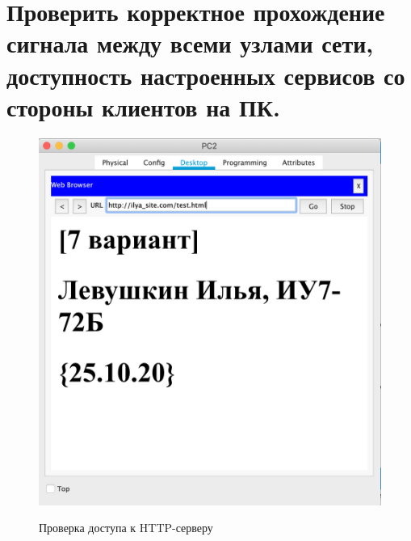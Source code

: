 \documentclass[a4paper,12pt]{article}
\begin{document}
	\newpage
	
	
	\section{Проверить корректное прохождение сигнала между всеми узлами сети, доступность настроенных сервисов со стороны клиентов на ПК.}
	
	\begin{figure}[h!]
		\begin{center}
			{\includegraphics[scale = 0.45]{13.png}}
			\label{ris:13}
		\end{center}
		\caption{Проверка доступа к HTTP-серверу}
	\end{figure}
\end{document}

